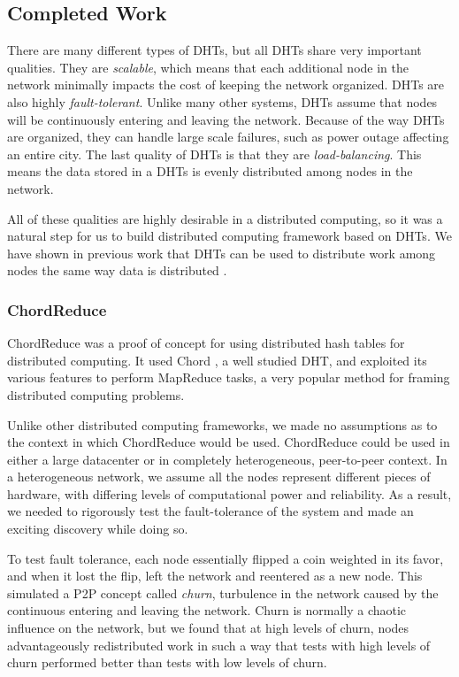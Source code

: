 \documentclass[12pt,a4paper]{article}
\begin{document}
\subsection*{Completed Work}


There are many different types of DHTs, but all DHTs share very important qualities.
They are \textit{scalable}, which means that each additional node in the network minimally impacts the cost of keeping the network organized.
DHTs are also highly \textit{fault-tolerant}.
Unlike many other systems, DHTs assume that nodes will be continuously entering and leaving the network.
Because of the way DHTs are organized, they can handle large scale failures, such as power outage affecting an entire city.
The last quality of DHTs is that they are  \textit{load-balancing}. 
This means the data stored in a DHTs is evenly distributed among nodes in the network.


All of these qualities are highly desirable in a distributed computing, so it was a natural step for us to build distributed computing framework based on DHTs.
We have shown in previous work that DHTs can be used to distribute work among nodes the same way data is distributed \cite{chordreduce}.

\subsubsection*{ChordReduce}
ChordReduce \cite{chordreduce} was a proof of concept for using distributed hash tables for distributed computing.  
It used Chord \cite{chord}, a well studied DHT, and exploited its various features to perform MapReduce \cite{mapreduce} tasks, a very popular method for framing distributed computing problems.

Unlike other distributed computing frameworks, we made no assumptions as to the context in which ChordReduce would be used.
ChordReduce could be used in either a large datacenter or in completely heterogeneous, peer-to-peer context.
In a heterogeneous network, we assume all the nodes represent different pieces of hardware, with differing levels of computational power and reliability.
As a result, we needed to rigorously test the fault-tolerance of the system and made an exciting discovery while doing so.

To test fault tolerance, each node essentially flipped a coin weighted in its favor, and when it lost the flip, left the network and reentered as a new node.
This simulated a P2P concept called \textit{churn}, turbulence in the network caused by the continuous entering and leaving the network.
Churn is normally a chaotic influence on the network, but we found that at high levels of churn, nodes advantageously redistributed work in such a way that tests with high levels of churn performed better than tests with low levels of churn.
\end{document}
